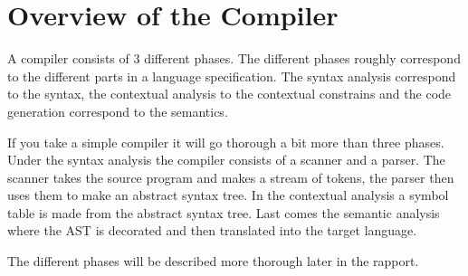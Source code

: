 \section{Overview of the Compiler}


A compiler consists of 3 different phases. The different phases roughly correspond to the different parts in a language specification. The syntax analysis correspond to the syntax, the contextual analysis to the contextual constrains and the code generation correspond to the semantics.


If you take a simple compiler it will go thorough a bit more than three phases. Under the syntax analysis the compiler consists of a scanner and a parser. The scanner takes the source program and makes a stream of tokens, the parser then uses them to make an abstract syntax tree. In the contextual analysis a symbol table is made from the abstract syntax tree. Last comes the semantic analysis where the AST is decorated and then translated into the target language.

The different phases will be described more thorough later in the rapport. 

